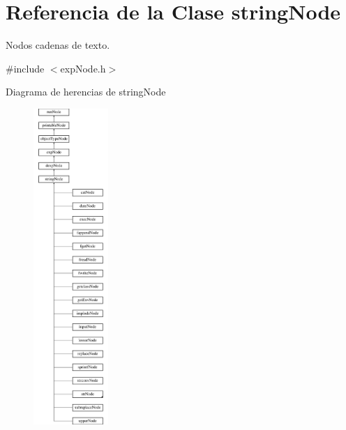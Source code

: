 \hypertarget{classstringNode}{\section{Referencia de la Clase string\-Node}
\label{classstringNode}
}


Nodos cadenas de texto.  




{\ttfamily \#include $<$exp\-Node.\-h$>$}

Diagrama de herencias de string\-Node\begin{figure}[H]
\begin{center}
\leavevmode
\includegraphics[height=12.000000cm]{classstringNode}
\end{center}
\end{figure}
